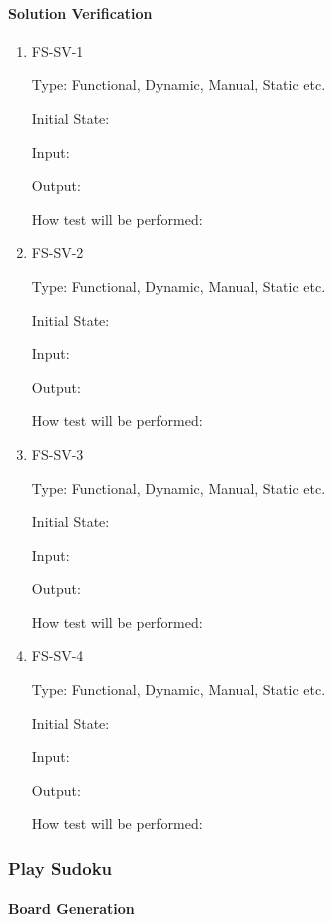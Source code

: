 \documentclass[11pt]{article}
\begin{document}
\paragraph{Solution Verification}

\begin{enumerate}

\item{FS-SV-1\\}

Type: Functional, Dynamic, Manual, Static etc.
					
Initial State: 
					
Input: 
					
Output: 
					
How test will be performed: 
					
\item{FS-SV-2\\}

Type: Functional, Dynamic, Manual, Static etc.
					
Initial State: 
					
Input: 
					
Output: 
					
How test will be performed: 

\item{FS-SV-3\\}

Type: Functional, Dynamic, Manual, Static etc.
					
Initial State: 
					
Input: 
					
Output: 
					
How test will be performed: 

\item{FS-SV-4\\}

Type: Functional, Dynamic, Manual, Static etc.
					
Initial State: 
					
Input: 
					
Output: 
					
How test will be performed: 

\end{enumerate}

\subsubsection{Play Sudoku}

\paragraph{Board Generation}
\end{document}

